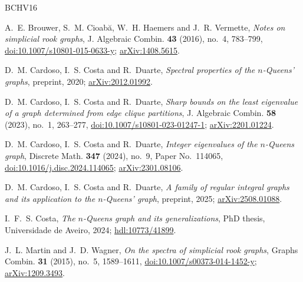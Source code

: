 \documentclass[11pt]{amsart}
\theoremstyle{plain}
\theoremstyle{definition}
\theoremstyle{remark}
\numberwithin{equation}{section}
\begin{document}
\begin{thebibliography}{BCHV16}

A.~E. Brouwer, S.~M. Cioab\u{a}, W.~H. Haemers and J.~R. Vermette,
\emph{Notes on simplicial rook graphs},
J. Algebraic Combin. \textbf{43} (2016), no.~4, 783--799,
\href{https://doi.org/10.1007/s10801-015-0633-y}{doi:10.1007/s10801-015-0633-y};
\href{https://arxiv.org/abs/1408.5615}{arXiv:1408.5615}.

D.~M. Cardoso, I.~S. Costa and R.~Duarte,
\emph{Spectral properties of the \(n\)-Queens' graphs}, preprint, 2020;
\href{https://arxiv.org/abs/2012.01992}{arXiv:2012.01992}.

D.~M. Cardoso, I.~S. Costa and R.~Duarte,
\emph{Sharp bounds on the least eigenvalue of a graph determined from edge clique
partitions}, J. Algebraic Combin. \textbf{58} (2023), no.~1, 263--277,
\href{https://doi.org/10.1007/s10801-023-01247-1}{doi:10.1007/s10801-023-01247-1};
\href{https://arxiv.org/abs/2201.01224}{arXiv:2201.01224}.

D.~M. Cardoso, I.~S. Costa and R.~Duarte,
\emph{Integer eigenvalues of the \(n\)-Queens graph},
Discrete Math. \textbf{347} (2024), no.~9, Paper No.~114065,
\href{https://doi.org/10.1016/j.disc.2024.114065}{doi:10.1016/j.disc.2024.114065};
\href{https://arxiv.org/abs/2301.08106}{arXiv:2301.08106}.

D.~M. Cardoso, I.~S. Costa and R.~Duarte,
\emph{A family of regular integral graphs and its application to the \(n\)-Queens'
graph}, preprint, 2025;
\href{https://arxiv.org/abs/2508.01088}{arXiv:2508.01088}.

I.~F.~S. Costa, \emph{The \(n\)-Queens graph and its generalizations}, PhD thesis,
Universidade de Aveiro, 2024;
\href{http://hdl.handle.net/10773/41899}{hdl:10773/41899}.

J.~L. Martin and J.~D. Wagner,
\emph{On the spectra of simplicial rook graphs}, Graphs Combin. \textbf{31} (2015),
no.~5, 1589--1611,
\href{https://doi.org/10.1007/s00373-014-1452-y}{doi:10.1007/s00373-014-1452-y};
\href{https://arxiv.org/abs/1209.3493}{arXiv:1209.3493}.

\end{thebibliography}
\end{document}
